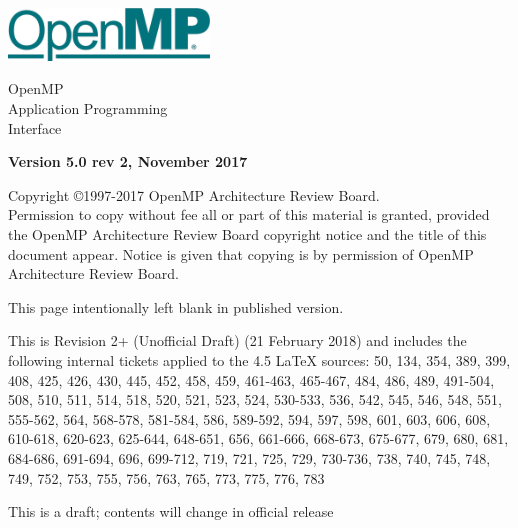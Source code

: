 
  \begin{titlepage}
    \begin{flushleft}
     \hspace{-6em} \includegraphics[width=0.4\textwidth]{openmp-logo.png}
    \end{flushleft}

    \begin{adjustwidth}{-0.75in}{0in}
    \begin{center}
      \Huge
      \textsf{OpenMP\\Application Programming\\Interface}

      \vspace{0.5in}\textsf{    }\vspace{-0.7in}
      \normalsize

      \vspace{1.0in}

      \textbf{Version 5.0 rev 2, November 2017}
    \end{center}
    \end{adjustwidth}

    \vspace{3.0in}

\begin{adjustwidth}{0pt}{1em}\setlength{\parskip}{0.25\baselineskip}%
Copyright \copyright 1997-2017 OpenMP Architecture Review Board.\\
Permission to copy without fee all or part of this material is granted,
provided the OpenMP Architecture Review Board copyright notice and
the title of this document appear. Notice is given that copying is by
permission of OpenMP Architecture Review Board.\end{adjustwidth}

  \end{titlepage}


\clearpage
\thispagestyle{empty}
\phantom{a}
This page intentionally left blank in published version.

This is Revision 2+ (Unofficial Draft) (21 February 2018) and
includes the following internal tickets applied to the 4.5 LaTeX sources:
50, 134, 354, 389, 399, 408, 425, 426, 430, 445, 452, 458, 459, 461-463, 
465-467, 484, 486, 489, 491-504, 508, 510, 511, 514, 518, 520, 521, 523, 
524, 530-533, 536, 542, 545, 546, 548, 551, 555-562, 564, 568-578, 581-584, 
586, 589-592, 594, 597, 598, 601, 603, 606, 608, 610-618, 620-623, 625-644, 
648-651, 656, 661-666, 668-673, 675-677, 679, 680, 681, 684-686, 691-694, 
696, 699-712, 719, 721, 725, 729, 730-736, 738, 740, 745, 748, 749, 752, 753, 
755, 756, 763, 765, 773, 775, 776, 783

This is a draft; contents will change in official release

\vfill


